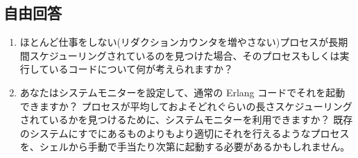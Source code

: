 \subsection*{自由回答}

\begin{enumerate}
  \item ほとんど仕事をしない(リダクションカウンタを増やさない)プロセスが長期間スケジューリングされているのを見つけた場合、そのプロセスもしくは実行しているコードについて何が考えられますか？

	\item あなたはシステムモニターを設定して、通常の Erlang コードでそれを起動できますか？ プロセスが平均しておよそどれぐらいの長さスケジューリングされているかを見つけるために、システムモニターを利用できますか？ 既存のシステムにすでにあるものよりもより適切にそれを行えるようなプロセスを、シェルから手動で手当たり次第に起動する必要があるかもしれません。

\end{enumerate}

